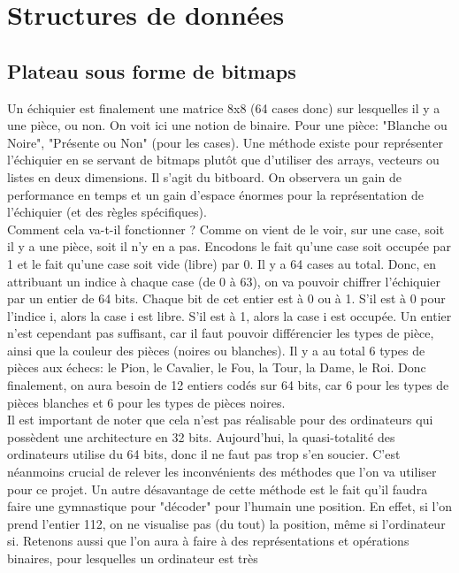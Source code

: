 \documentclass{article}
\begin{document}
\section{Structures de données}
\label{DataStruct}

\subsection{Plateau sous forme de bitmaps}
Un échiquier est finalement une matrice 8x8 (64 cases donc) sur lesquelles il y a une pièce, ou non. On voit ici une
notion de binaire. Pour une pièce: "Blanche ou Noire", "Présente ou Non" (pour les cases). Une méthode existe pour
représenter l'échiquier en se servant de bitmaps plutôt que d'utiliser des arrays, vecteurs ou listes en deux dimensions.
Il s'agit du bitboard. On observera un gain de performance en temps et un gain d'espace énormes pour la représentation
de l'échiquier (et des règles spécifiques).\\
Comment cela va-t-il fonctionner ? Comme on vient de le voir, sur une case, soit il y a une pièce, soit il n'y en a pas.
Encodons le fait qu'une case soit occupée par 1 et le fait qu'une case soit vide (libre) par 0. Il y a 64 cases au total.
Donc, en attribuant un indice à chaque case (de 0 à 63), on va pouvoir chiffrer l'échiquier par un entier de 64 bits.
Chaque bit de cet entier est à 0 ou à 1. S'il est à 0 pour l'indice i, alors la case i est libre. S'il est à 1, alors la
case i est occupée. Un entier n'est cependant pas suffisant, car il faut pouvoir différencier les types de pièce, ainsi
que la couleur des pièces (noires ou blanches). Il y a au total 6 types de pièces aux échecs: le Pion, le Cavalier, le Fou,
la Tour, la Dame, le Roi. Donc finalement, on aura besoin de 12 entiers codés sur 64 bits, car 6 pour les types de pièces
blanches et 6 pour les types de pièces noires.
\\Il est important de noter que cela n'est pas réalisable pour des ordinateurs qui possèdent une architecture en 32 bits.
Aujourd'hui, la quasi-totalité des ordinateurs utilise du 64 bits, donc il ne faut pas trop s'en soucier. C'est néanmoins
crucial de relever les inconvénients des méthodes que l'on va utiliser pour ce projet. Un autre désavantage de cette méthode
est le fait qu'il faudra faire une gymnastique pour "décoder" pour l'humain une position. En effet, si l'on prend l'entier
112, on ne visualise pas (du tout) la position, même si l'ordinateur si.
Retenons aussi que l'on aura à faire à des représentations et opérations binaires, pour lesquelles un ordinateur est très
\end{document}
